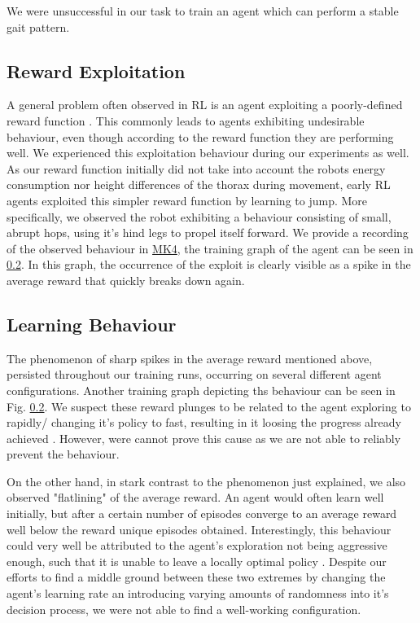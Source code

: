 We were unsuccessful in our task to train an agent which can perform a stable gait pattern.


\subsection{Reward Exploitation}
A general problem often observed in RL is an agent exploiting a poorly-defined reward function \parencite{silver2015}.
This commonly leads to agents exhibiting undesirable behaviour, even though according to the reward function they are performing well.
We experienced this exploitation behaviour during our experiments as well.
As our reward function initially did not take into account the robots energy consumption nor height differences of the thorax during movement, early RL agents exploited this simpler reward function by learning to jump.
More specifically, we observed the robot exhibiting	 a behaviour consisting of small, abrupt hops, using it's hind legs to propel itself forward.
We provide a recording of the observed behaviour in \hyperref[vid: MK4]{MK4}, the training graph of the agent can be seen in \ref{}.
In this graph, the occurrence of the exploit is clearly visible as a spike in the average reward that quickly breaks down again.

\subsection{Learning Behaviour}
The phenomenon of sharp spikes in the average reward mentioned above, persisted throughout our training runs, occurring on several different agent configurations.
Another training graph depicting ths behaviour can be seen in Fig. \ref{}.
We suspect these reward plunges to be related to the agent exploring to rapidly/ changing it's policy to fast, resulting in it loosing the progress already achieved \parencite{silver2015}.
However, were cannot prove this cause as we are not able to reliably prevent the behaviour.

On the other hand, in stark contrast to the phenomenon just explained, we also observed "flatlining" of the average reward.
An agent would often learn well initially, but after a certain number of episodes converge to an average reward well below the reward unique episodes obtained.
Interestingly, this behaviour could very well be attributed to the agent's exploration not being aggressive enough, such that it is unable to leave a locally optimal policy \parencite{silver2015}.
Despite our efforts to find a middle ground between these two extremes by changing the agent's learning rate an introducing varying amounts of randomness into it's decision process, we were not able to find a well-working configuration.

